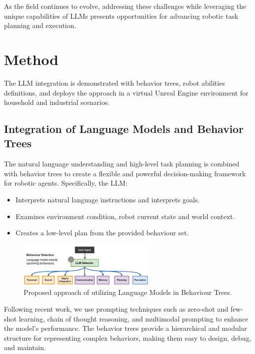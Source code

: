 \documentclass[pdflatex,sn-mathphys-num]{sn-jnl}
\theoremstyle{thmstyleone}
\theoremstyle{thmstyletwo}%
\theoremstyle{thmstylethree}%
\begin{document}
As the field continues to evolve, addressing these challenges while leveraging the unique capabilities of LLMs presents opportunities for advancing robotic task planning and execution.



\section{Method}
The LLM integration is demonstrated with behavior trees, robot abilities definitions, and deploys the approach in a virtual Unreal Engine environment for household and industrial scenarios.

\subsection{Integration of Language Models and Behavior Trees}
The natural language understanding and high-level task planning is combined  with behavior trees to create a flexible and powerful decision-making framework for robotic agents. Specifically, the LLM:


\begin{itemize}
    \item Interprets natural language instructions and interprets goals.
    \item Examines environment condition, robot current state and world context.
    \item Creates a low-level plan from the provided behaviour set.
    \end{itemize}
    

\begin{figure}[H]
\centering
\includegraphics[width=0.6\textwidth]{figures/Picture12.png}
\caption{Proposed approach of utilizing Language Models in Behaviour Trees.}\label{fig7}
\end{figure}
Following recent work, we use prompting techniques such as zero-shot and few-shot learning, chain of thought reasoning, and multimodal prompting to enhance the model's performance. The behavior trees provide a hierarchical and modular structure for representing complex behaviors, making them easy to design, debug, and maintain.
\newpage
\end{document}
